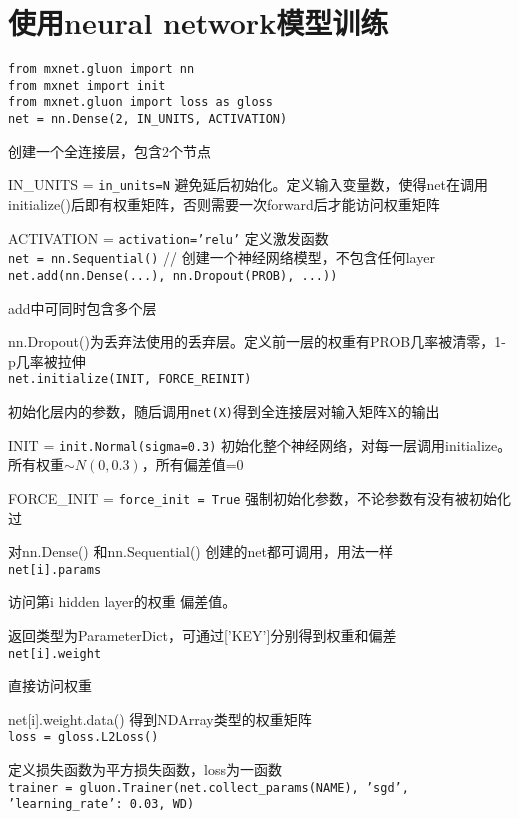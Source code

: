 \documentclass[UTF8]{ctexart}
\begin{document}
\section{使用neural network模型训练}

\noindent \texttt{from mxnet.gluon import nn}\\
\texttt{from mxnet import init}\\
\texttt{from mxnet.gluon import loss as gloss}\\
\texttt{net = nn.Dense(2, IN\_UNITS, ACTIVATION)}

  创建一个全连接层，包含2个节点

  IN\_UNITS = \texttt{in\_units=N} 避免延后初始化。定义输入变量数，使得net在调用initialize()后即有权重矩阵，否则需要一次forward后才能访问权重矩阵
  
  ACTIVATION = \texttt{activation='relu'} 定义激发函数\\
\texttt{net = nn.Sequential()} // 创建一个神经网络模型，不包含任何layer\\
\texttt{net.add(nn.Dense(...), nn.Dropout(PROB), ...))}

  add中可同时包含多个层
  
  nn.Dropout()为丢弃法使用的丢弃层。定义前一层的权重有PROB几率被清零，1-p几率被拉伸\\
\texttt{net.initialize(INIT, FORCE\_REINIT)} 

  初始化层内的参数，随后调用\texttt{net(X)}得到全连接层对输入矩阵X的输出
  
  INIT = \texttt{init.Normal(sigma=0.3)} 初始化整个神经网络，对每一层调用initialize。所有权重$\sim N(0, 0.3)$，所有偏差值=0
  
  FORCE\_INIT = \texttt{force\_init = True} 强制初始化参数，不论参数有没有被初始化过
  
  对nn.Dense() 和nn.Sequential() 创建的net都可调用，用法一样\\
\texttt{net[i].params}

  访问第i hidden layer的权重 偏差值。
  
  返回类型为ParameterDict，可通过['KEY']分别得到权重和偏差\\
\texttt{net[i].weight} 
  
  直接访问权重

  net[i].weight.data() 得到NDArray类型的权重矩阵\\
\texttt{loss = gloss.L2Loss()}
  
  定义损失函数为平方损失函数，loss为一函数\\
\texttt{trainer = gluon.Trainer(net.collect\_params(NAME), 'sgd', {'learning\_rate': 0.03}, WD)}
\end{document}

